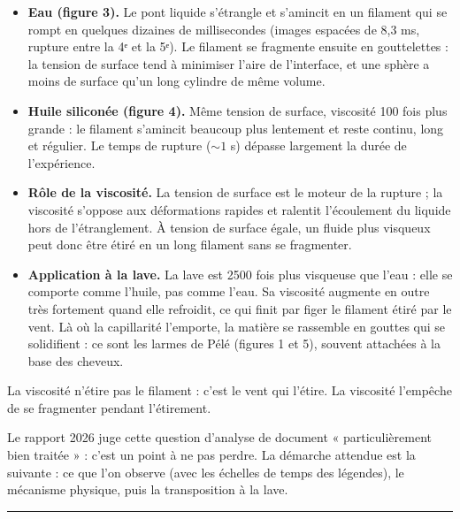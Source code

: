 \documentclass[11pt,a4paper]{article}
\providecommand{\tightlist}{\setlength{\itemsep}{0pt}\setlength{\parskip}{0pt}}
\begin{document}
\begin{itemize}
\tightlist
\item
  \textbf{Eau (figure 3).} Le pont liquide s'étrangle et s'amincit en un filament qui se rompt en quelques dizaines de millisecondes (images espacées de 8,3 ms, rupture entre la 4ᵉ et la 5ᵉ). Le filament se fragmente ensuite en gouttelettes : la tension de surface tend à minimiser l'aire de l'interface, et une sphère a moins de surface qu'un long cylindre de même volume.
\item
  \textbf{Huile siliconée (figure 4).} Même tension de surface, viscosité 100 fois plus grande : le filament s'amincit beaucoup plus lentement et reste continu, long et régulier. Le temps de rupture (\(\sim 1\) s) dépasse largement la durée de l'expérience.
\item
  \textbf{Rôle de la viscosité.} La tension de surface est le moteur de la rupture ; la viscosité s'oppose aux déformations rapides et ralentit l'écoulement du liquide hors de l'étranglement. À tension de surface égale, un fluide plus visqueux peut donc être étiré en un long filament sans se fragmenter.
\item
  \textbf{Application à la lave.} La lave est 2500 fois plus visqueuse que l'eau : elle se comporte comme l'huile, pas comme l'eau. Sa viscosité augmente en outre très fortement quand elle refroidit, ce qui finit par figer le filament étiré par le vent. Là où la capillarité l'emporte, la matière se rassemble en gouttes qui se solidifient : ce sont les larmes de Pélé (figures 1 et 5), souvent attachées à la base des cheveux.
\end{itemize}

\begin{piege}

La viscosité n'étire pas le filament : c'est le vent qui l'étire. La viscosité l'empêche de se fragmenter pendant l'étirement.

\end{piege}

\begin{jury}

Le rapport 2026 juge cette question d'analyse de document « particulièrement bien traitée » : c'est un point à ne pas perdre. La démarche attendue est la suivante : ce que l'on observe (avec les échelles de temps des légendes), le mécanisme physique, puis la transposition à la lave.

\end{jury}

\begin{center}\rule{0.5\linewidth}{0.5pt}\end{center}
\end{document}
